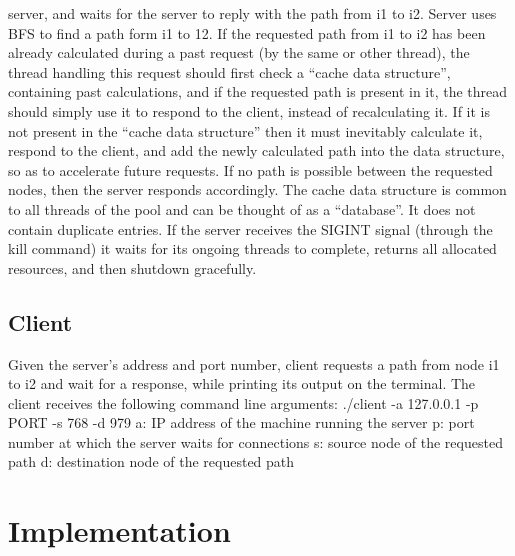 \documentclass[twoside,11pt]{article}
\begin{document}
server, and waits for the server to reply with the path from i1 to i2. Server uses BFS to find a path form i1 to 12. If the requested path from i1 to i2 has been already calculated during a past request (by the same or other thread), the thread handling this request should first check a “cache data structure”, containing past calculations, and if the requested path is present in it, the thread should simply use it to respond to the client, instead of recalculating it. If it is not present in the “cache data structure” then it must inevitably calculate it, respond to the client, and add the newly calculated path into the data structure, so as to accelerate future requests. If no path is possible between the requested nodes, then the server responds accordingly. The cache data structure is common to all threads of the pool and can be thought of as a “database”. It does not contain duplicate entries.\newline
\newline
If the server receives the SIGINT signal (through the kill command) it waits for its ongoing threads to complete, returns all allocated resources, and then shutdown gracefully. \newline

\subsection{Client}

Given the server’s address and port number, client requests a path from node i1 to i2 and wait for a response, while printing its output on the terminal.\newline
\newline
The client receives the following command line arguments: \newline
\newline
./client -a 127.0.0.1 -p PORT -s 768 -d 979 \newline
\newline
a: IP address of the machine running the server \newline
p: port number at which the server waits for connections \newline
s: source node of the requested path \newline
d: destination node of the requested path \newline

\newpage

\section{Implementation}
\label{sec:background}
\end{document}
